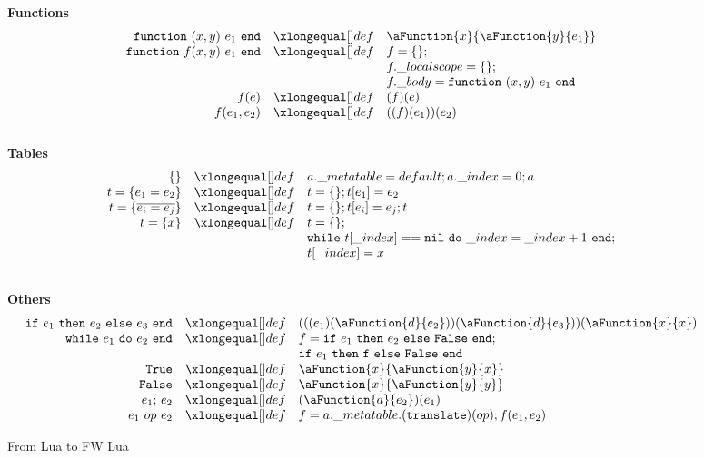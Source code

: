 \begin{figure}[P]
\caption{From Lua to FW Lua}
{\bf Functions}
\label{fig:Desugaring}
\[
\begin{array}{rclcl}
\desugar{
    {\tt function}~(x,y)~e_1~{\tt end}
}{
    \aFunction{x}{\aFunction{y}{e_1}}
}
\desugar{
    {\tt function}~f(x,y)~e_1~{\tt end}}{f = \{\};}
\desugarline{f.\_localscope = \{\};\\
          f.\_body = {\tt function}~(x,y)~e_1~{\tt end}
}
\desugar{f(e)}{(f)(e)}
\desugar{f(e_1,e_2)}{((f)(e_1))(e_2)}
\\
\end{array}
\]
{\bf Tables}
\label{fig:tables}
\[
\begin{array}{rclcl}
\desugar{
    \{\}
}{
   a.\_metatable = default; a.\_index = 0; a\\
}
\desugar{
    t = \{e_1=e_2\}
}{
   t = \{\}; t[e_1] = e_2
}
\desugar{
    t = \{\overline{e_i = e_j}\}
}{
  t = \{\}; t[e_i]=e_j; t 
}
\desugar{
    t = \{x\}
}{
   t = \{\};}
\desugarline{
   {\tt while}~t[\_index] == {\tt nil~do} ~ \_index = \_index + 1~ {\tt end};\\
   t[\_index] = x
   
}

\\
\end{array}
\]

{\bf Others}\[
\begin{array}{rclcl}
\desugar{
    {\tt if}~e_1~{\tt then}~e_2~{\tt else}~e_3~{\tt end}
}{
    (((e_1)(\aFunction{d}{e_2}))(\aFunction{d}{e_3}))(\aFunction{x}{x})
}
\desugar{
    {\tt while}~e_1~{\tt do}~e_2~{\tt end}
}{
    f =  {\tt if}~e_1~{\tt then}~e_2~{\tt else}~{\tt False}~{\tt end};\\}
\desugarline{
    {\tt if}~e_1~{\tt then}~{\tt f}~{\tt else}~{\tt False}~{\tt end}
}
\desugar{\tt True}{\aFunction{x}{\aFunction{y}{x}}}
\desugar{\tt False}{\aFunction{x}{\aFunction{y}{y}}}
\desugar{e_1{\tt ;}~e_2}{(\aFunction{a}{e_2})(e_1)}
\desugar{
    e_1~ op ~e_2
}{
    f = a.\_metatable.({\tt translate})(op); f(e_1, e_2)
    
}
\end{array}\]


\end{figure}

